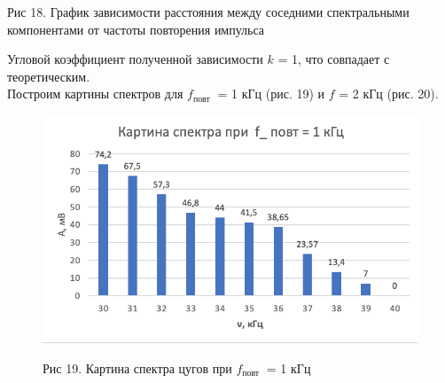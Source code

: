 \documentclass[a4paper,12pt]{article} %
\begin{document}
\begin{center}
                    \begin{center}
                    {Рис 18.} График зависимости расстояния между соседними спектральными компонентами от частоты повторения импульса\\
                    \end{center}
                \end{center}
Угловой коэффициент полученной зависимости $k$ = 1, что совпадает с теоретическим.\\
                Построим картины спектров для $f_{\text {повт }}$  =  1 кГц  (рис. 19) и $ f$ = 2 кГц  (рис. 20).

\begin{figure}[p]
	\centering
	\includegraphics[width=0.8\linewidth]{"f1"}
                     \begin{center}
                    {Рис 19.} Картина спектра цугов при $f_{\text {повт }}$ = 1 кГц\\
                    \end{center}

	\label{fig:1-50}
\end{figure}
\end{document}
